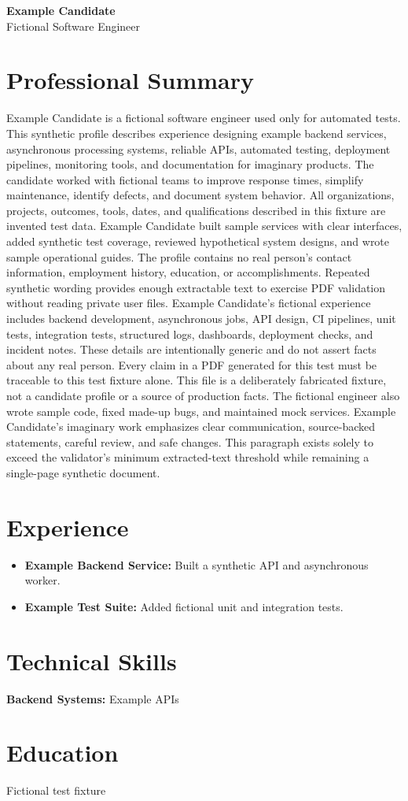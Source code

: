 \documentclass[10pt]{article}
\begin{document}
\begin{center}
{\large\textbf{Example Candidate}}\\[8pt]
Fictional Software Engineer
\end{center}
\section*{Professional Summary}
Example Candidate is a fictional software engineer used only for automated tests. This synthetic profile describes experience designing example backend services, asynchronous processing systems, reliable APIs, automated testing, deployment pipelines, monitoring tools, and documentation for imaginary products. The candidate worked with fictional teams to improve response times, simplify maintenance, identify defects, and document system behavior. All organizations, projects, outcomes, tools, dates, and qualifications described in this fixture are invented test data. Example Candidate built sample services with clear interfaces, added synthetic test coverage, reviewed hypothetical system designs, and wrote sample operational guides. The profile contains no real person's contact information, employment history, education, or accomplishments. Repeated synthetic wording provides enough extractable text to exercise PDF validation without reading private user files. Example Candidate's fictional experience includes backend development, asynchronous jobs, API design, CI pipelines, unit tests, integration tests, structured logs, dashboards, deployment checks, and incident notes. These details are intentionally generic and do not assert facts about any real person. Every claim in a PDF generated for this test must be traceable to this test fixture alone. This file is a deliberately fabricated fixture, not a candidate profile or a source of production facts. The fictional engineer also wrote sample code, fixed made-up bugs, and maintained mock services. Example Candidate's imaginary work emphasizes clear communication, source-backed statements, careful review, and safe changes. This paragraph exists solely to exceed the validator's minimum extracted-text threshold while remaining a single-page synthetic document.
\section*{Experience}
\begin{itemize}
\item \textbf{Example Backend Service:} Built a synthetic API and asynchronous worker.
\item \textbf{Example Test Suite:} Added fictional unit and integration tests.
\end{itemize}
\section*{Technical Skills}
\textbf{Backend Systems:} Example APIs\\
\section*{Education}
Fictional test fixture
\end{document}
